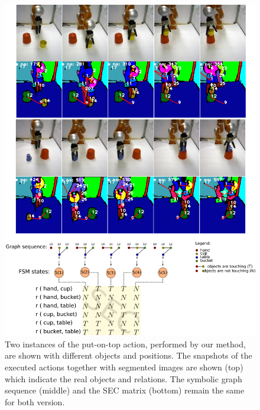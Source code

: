 \begin{figure}
      \centering
      \includegraphics[scale=0.20]{./pdf/result_puton.pdf}
      \caption{ Two instances of the put-on-top action, performed by our method, are shown with different objects and positions. 
The snapshots of the executed actions together with segmented images are shown (top) which indicate the real objects and relations.
The symbolic graph sequence (middle) and the SEC matrix (bottom) remain the same for both version.
}
      \label{fig:result_puton}
\end{figure}



 









